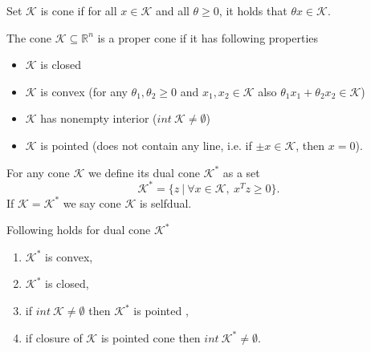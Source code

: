 \documentclass[12pt]{book}
\theoremstyle{definition}
\begin{document}
\begin{appendix}
\label{defCone}
Set $\mathcal{K}$ is cone if for all $x\in \mathcal{K}$ and all $\theta\geq 0$, it holds that $\theta x \in \mathcal{K}$.



\label{defProperCone}
The cone $\mathcal{K}\subseteq \mathbb{R}^n$ is a proper cone if it has following properties
\begin{itemize}
\item $\mathcal{K}$ is closed
\item $\mathcal{K}$ is convex (for any $\theta_1,\theta_2\geq 0$ and $x_1,x_2\in\mathcal{K}$ also $\theta_1x_1 + \theta_2x_2 \in\mathcal{K}$)
\item $\mathcal{K}$ has nonempty interior  ($int \ \mathcal{K} \neq \emptyset$)
\item $\mathcal{K}$ is pointed (does not contain any line, i.e. if $\pm x\in \mathcal{K}$, then $x=0$).
\end{itemize}

\label{defDualCone}
For any cone $\mathcal{K}$ we define its dual cone $\mathcal{K}^*$ as a set
\begin{equation*}
\mathcal{K}^* = \{z\ |\ \forall x\in\mathcal{K}, \ x^Tz\geq 0\}.
\end{equation*}
If  $\mathcal{K} =  \mathcal{K}^*$ we say cone $\mathcal{K}$ is selfdual.




\prop[{[\ref{PokornaSOCPDipl}]}] \label{DualConePropertiesProp}
Following holds for dual cone $\mathcal{K}^*$
\begin{enumerate}
\item  $\mathcal{K}^*$ is convex,
\item  $\mathcal{K}^*$ is closed,
\item if $int \ \mathcal{K}\neq \emptyset$ then $\mathcal{K}^*$ is pointed ,
\item if closure of $\mathcal{K}$ is pointed cone then $int \ \mathcal{K}^*\neq \emptyset$.
\end{enumerate}


\end{appendix}
\end{document}
